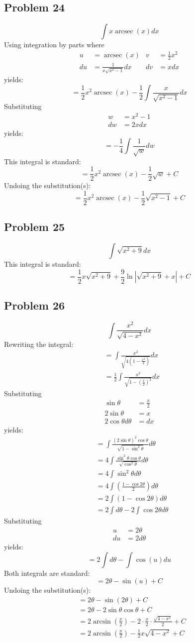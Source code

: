 \documentclass{article}
\DeclareMathOperator{\arcsec}{arcsec}
\begin{document}
\subsection*{Problem 24}
$$\int x\arcsec\left(x\right)dx$$
Using integration by parts where
\begin{align*}
u&=\arcsec(x) &v&=\frac{1}{2}x^2 \\
du&=\frac{1}{x\sqrt{x^2-1}}dx &dv&=xdx
\end{align*}
yields:
$$=\frac{1}{2}x^2\arcsec(x)-\frac{1}{2}\int\frac{x}{\sqrt{x^2-1}}dx$$
Substituting
\begin{align*}
w&=x^2-1 \\
dw&=2xdx
\end{align*}
yields:
$$=-\frac{1}{4}\int\frac{1}{\sqrt{w}}dw$$
This integral is standard:
$$=\frac{1}{2}x^2\arcsec(x)-\frac{1}{2}\sqrt{w}+C$$
Undoing the substitution(s):
$$=\frac{1}{2}x^2\arcsec(x)-\frac{1}{2}\sqrt{x^2-1}+C$$
\subsection*{Problem 25}
$$\int\sqrt{x^2+9}dx$$
This integral is standard:
$$=\frac{1}{2}x\sqrt{x^2+9}+\frac{9}{2}\ln\left|\sqrt{x^2+9}+x\right|+C$$
\subsection*{Problem 26}
$$\int\frac{x^2}{\sqrt{4-x^2}}dx$$
Rewriting the integral:
\begin{align*}
&=\int\frac{x^2}{\sqrt{4(1-\frac{x^2}{4})}}dx \\
&=\frac{1}{2}\int\frac{x^2}{\sqrt{1-(\frac{x}{2})^2}}dx
\end{align*}
Substituting
\begin{align*}
\sin\theta&=\frac{x}{2} \\
2\sin\theta&=x \\
2\cos\theta d\theta&=dx
\end{align*}
yields:
\begin{align*}
&=\int\frac{(2\sin\theta)^2\cos\theta}{\sqrt{1-\sin^2\theta}}d\theta \\
&=4\int\frac{\sin^2\theta\cos\theta}{\sqrt{\cos^2\theta}}d\theta \\
&=4\int\sin^2\theta d\theta \\
&=4\int\left(\frac{1-\cos2\theta}{2}\right)d\theta \\
&=2\int(1-\cos2\theta)d\theta \\
&=2\int d\theta-2\int\cos2\theta d\theta
\end{align*}
Substituting
\begin{align*}
u&=2\theta \\
du&=2d\theta 
\end{align*}
yields:
$$=2\int d\theta-\int\cos(u)du$$
Both integrals are standard:
$$=2\theta-\sin(u)+C$$
Undoing the substitution(s):
\begin{align*}
&=2\theta-\sin(2\theta)+C \\
&=2\theta-2\sin\theta\cos\theta+C \\
&=2\arcsin\left(\frac{x}{2}\right)-2\cdot\frac{x}{2}\cdot\frac{\sqrt{4-x^2}}{2}+C \\
&=2\arcsin\left(\frac{x}{2}\right)-\frac{1}{2}x\sqrt{4-x^2}+C
\end{align*}
\end{document}
